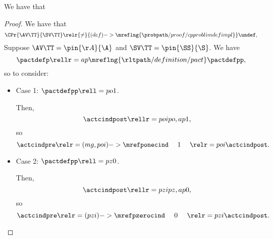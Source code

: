 \begin{proposition}
  We have that %
\end{proposition}

\begin{proof}
  We have that
  $$\CPr{\AV\TT}{\SV\TT} \relr {\ne} {(def)->\mreflng{\probpath/proof/cpproblimdefimpl}} \undef,$$
  Suppose 
  $\AV\TT = \pin{\AA}{\A}$
  and
  $\SV\TT = \pin{\SS}{\S}$. We have
  $$\pactdefp \rellr = ap {\mreflng{\rltpath/definition/pact}} \pactdefpp,$$
  so  to consider:
  \begin{itemize}
    \item {} Case 1: $\pactdefpp \rell = po 1$.

      Then,
      $$\actcindpost \rellr = poi po,ap 1,$$
      so
      $$\actcindpre \relr = (mg,poi)->{\mrefponecind} \ \ \ \ 1\ \ \ \ \relr = poi \actcindpost.$$
    \item {} Case 2: $\pactdefpp \rell = pz 0$.

      Then,
      $$\actcindpost \rellr = pzi pz,ap 0,$$
      so
      $$\actcindpre \relr = (pzi)->{\mrefpzerocind} \ \ \ \ 0\ \ \ \ \relr = pzi \actcindpost.$$
  \end{itemize}
\end{proof}
